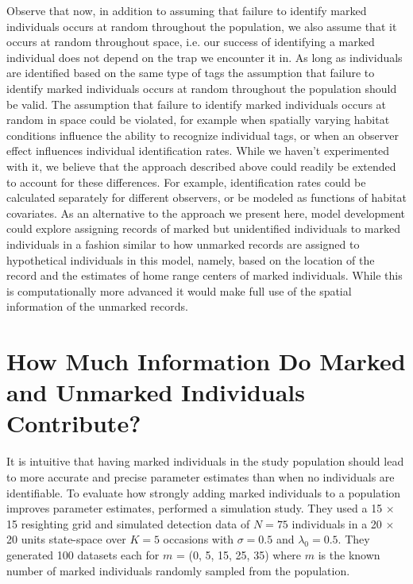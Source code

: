 Observe that now, in addition to assuming that failure to identify
marked individuals occurs at random throughout the population, we also
assume that it occurs at random throughout space, i.e. our success of
identifying a marked individual does not depend on the trap we
encounter it in. As long as individuals are identified based on the same type of tags
the assumption that failure to identify marked individuals occurs at
random throughout the population should be valid. The assumption that
failure to identify marked individuals occurs at random in space could
be violated, for example when spatially varying habitat conditions
influence the ability to recognize individual tags, or when an
observer effect influences individual identification rates. While we
haven't experimented with it, we believe that the approach
described above could readily be extended to account for these
differences. For example, identification rates could be calculated
separately for different observers, or be modeled as functions of
habitat covariates. As an alternative to the approach we present here,
model development could explore assigning records of marked but
unidentified individuals to marked individuals in a fashion similar to
how unmarked records are assigned to hypothetical individuals in this
model, namely, based on the location of the record and the estimates
of home range centers of marked individuals. While this is
computationally more advanced it would make full use of the spatial
information of the unmarked records.


\section{How Much Information Do Marked and Unmarked Individuals Contribute?}
\label{partialID.sec.info}
It is intuitive that having marked individuals in the study population
should lead to more accurate and precise parameter estimates than when
no individuals are identifiable. To evaluate how strongly adding
marked individuals to a population improves parameter estimates,
\citet{chandler_royle:2012} performed a simulation study. They used a
15 $\times$ 15 resighting grid and simulated detection data of $N =
75$ individuals in a 20 $\times$ 20 units state-space over $K = 5$
occasions with $\sigma = 0.5$ and $\lambda_0 = 0.5$. They generated
100 datasets each for $m$ = (0, 5, 15, 25, 35) where $m$ is the known
number of marked individuals randomly sampled from the population.


